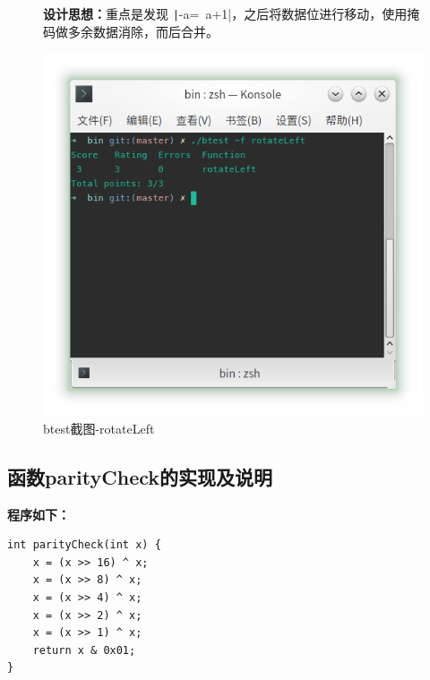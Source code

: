 \begin{figure}[H]
\begin{minipage}[c]{0.5\linewidth}
\textbf{设计思想：}重点是发现 \texttt|-a=~a+1|，之后将数据位进行移动，使用掩码做多余数据消除，而后合并。
\end{minipage}
\begin{minipage}[c]{0.4\linewidth}
\centering
\includegraphics[width=0.9\linewidth]{figures/rotateLeft}
\caption{btest截图-rotateLeft}
\label{fig:rotateLeft}
\end{minipage}
\end{figure}

\subsection{函数parityCheck的实现及说明}

\textbf{程序如下：}

\begin{verbatim}
int parityCheck(int x) {
    x = (x >> 16) ^ x;
    x = (x >> 8) ^ x;
    x = (x >> 4) ^ x;
    x = (x >> 2) ^ x;
    x = (x >> 1) ^ x;
    return x & 0x01;
}
\end{verbatim}

